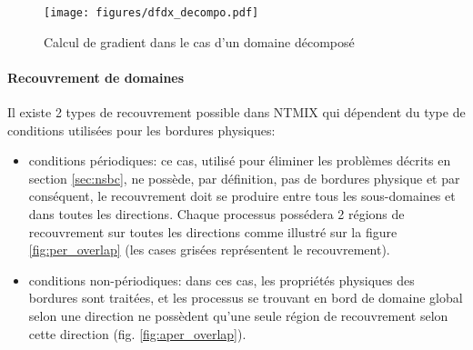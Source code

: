 \begin{figure}[!ht]
  \centering
  \texttt{[image: figures/dfdx\_decompo.pdf]}
  \caption{\label{fig:dfdx_decompo} Calcul de gradient dans le cas d'un domaine décomposé}
\end{figure}


\paragraph{Recouvrement de domaines}\label{sec:overlapping}
Il existe 2 types de recouvrement possible dans NTMIX qui dépendent du type de conditions utilisées pour les bordures physiques:
\begin{itemize}
\item conditions périodiques: ce cas, utilisé pour éliminer les problèmes décrits en section \ref{sec:nsbc}, ne possède, par définition, pas de bordures physique et par conséquent, le recouvrement doit se produire entre tous les sous-domaines et dans toutes les directions. Chaque processus possédera 2 régions de recouvrement sur toutes les directions comme illustré sur la figure \ref{fig:per_overlap} (les cases grisées représentent le recouvrement).
\item conditions non-périodiques: dans ces cas, les propriétés physiques des bordures sont traitées, et les processus se trouvant en bord de domaine global selon une direction ne possèdent qu'une seule région de recouvrement selon cette direction (fig. \ref{fig:aper_overlap}). 
\end{itemize}

